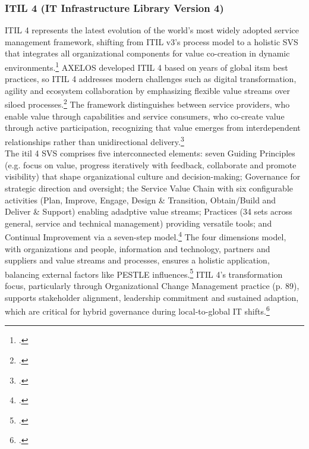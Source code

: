 \subsubsection{ITIL 4 (IT Infrastructure Library Version 4)}
\label{subsubsec:ITIL4}
\ac{ITIL} 4 represents the latest evolution of the world's most widely adopted service management framework, shifting from \ac{ITIL} v3's process model to a holistic \ac{SVS} that integrates all organizational components for value co-creation in dynamic environments.\footcite[36]{axelosITIL4Foundation2019}
AXELOS developed \ac{ITIL} 4 based on years of global \ac{itsm} best practices, so \ac{ITIL} 4 addresses modern challenges such as digital transformation, agility and ecosystem collaboration by emphasizing flexible value streams over siloed processes.\footcite[2-3]{axelosITIL4Foundation2019}
The framework distinguishes between service providers, who enable value through capabilities and service consumers, who co-create value through active participation, recognizing that value emerges from interdependent relationships rather than unidirectional delivery.\footcite[7-8]{axelosITIL4Foundation2019}
\\
The \ac{itil} 4 \ac{SVS} comprises five interconnected elements: seven Guiding Principles (e.g. focus on value, progress iteratively with feedback, collaborate and promote visibility) that shape organizational culture and decision-making; Governance for strategic direction and oversight; the Service Value Chain with six configurable activities (Plan, Improve, Engage, Design \& Transition, Obtain/Build and Deliver \& Support) enabling adadptive value streams; Practices (34 sets across general, service and technical management) providing versatile tools; and Continual Improvement via a seven-step model.\footcite[36-74]{axelosITIL4Foundation2019}
The four dimensions model, with organizations and people, information and technology, partners and suppliers and value streams and processes, ensures a holistic application, balancing external factors like \Gls{PESTLE} influences.\footcite[23-34]{axelosITIL4Foundation2019}
\ac{ITIL} 4's transformation focus, particularly through Organizational Change Management practice (p. 89), supports stakeholder alignment, leadership commitment and sustained adaption, which are critical for hybrid governance during local-to-global IT shifts.\footcite[89]{axelosITIL4Foundation2019}

